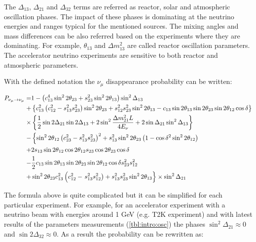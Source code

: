 \documentclass[../main.tex]{subfiles}
\begin{document}
The $\Delta_{13}$, $\Delta_{21}$ and $\Delta_{32}$ terms are referred as reactor, solar and atmospheric oscillation phases. The impact of these phases is dominating at the neutrino energies and ranges typical for the mentioned sources. The mixing angles and mass differences can be also referred based on the experiments where they are dominating. For example, $\theta_{13}$ and $\Delta m^2_{13}$ are called reactor oscillation parameters. The accelerator neutrino experiments are sensitive to both reactor and atmospheric parameters.

With the defined notation the $\nu_\mu$ disappearance probability can be written:

\begin{equation}
\begin{split}
P_{\nu_\mu\to\nu_\mu}=&1-\left(c^4_{13}\sin^22\theta_{23} + s^2_{23}\sin^22\theta_{13}\right)\sin^2\Delta_{13} \\
+&\left\{c_{13}^2\left(c^2_{12}-s^2_{13}s^2_{23}\right)\sin^22\theta_{23}+s^2_{12}s^2_{23}\sin^22\theta_{13}-c_{13}\sin2\theta_{13}\sin2\theta_{23}\sin2\theta_{12}\cos\delta\right\} \\
\times&\left\{\frac{1}{2}\sin2\Delta_{21}\sin2\Delta_{13}+2\sin^2\frac{\Delta m_{21}^2L}{4E_\nu} + 2\sin\Delta_{21}\sin^2\Delta_{13}\right\} \\
-&\left\{\sin^22\theta_{12}\left(c^2_{23}-s^2_{13}s^2_{23}\right)^2+s_{13}^2\sin^22\theta_{23}\left(1-\cos\delta^2\sin^22\theta_{12}\right) \right.\\
+&2s_{13}\sin2\theta_{12}\cos2\theta_{12}s_{23}\cos2\theta_{23}\cos\delta \\
-&\frac{1}{2}c_{13}\sin2\theta_{13}\sin2\theta_{23}\sin2\theta_{12}\cos\delta s^2_{23}s^2_{12} \\
 +&\sin^22\theta_{23}c^2_{13}\left(c^2_{12}-\left. {}s^2_{13}s^2_{12}\right)+s^2_{13}s^2_{23}\sin^22\theta_{13} \vphantom{\left(\sin^22\theta_{12}\right)^2} \right\}\times\sin^2\Delta_{21}
\end{split}
\label{eq:intro:disapp_p}
\end{equation}

The formula above is quite complicated but it can be simplified for each particular experiment. For example, for an accelerator experiment with a neutrino beam with energies around 1 GeV (e.g. T2K experiment) and with latest results of the parameters measurements (\autoref{tbl:intro:osc}) the phases $\sin^2\Delta_{21}\approx0$ and $\sin2\Delta_{32}\approx0$. As a result the probability can be rewritten as:
\end{document}
